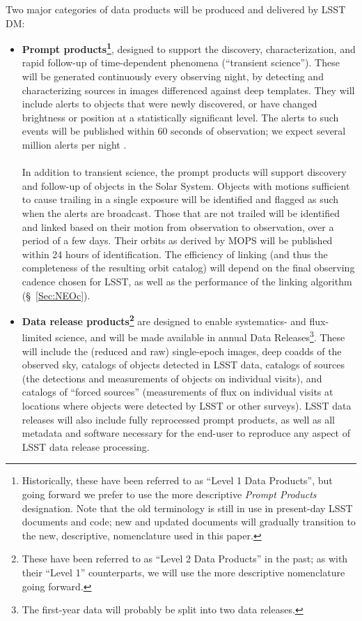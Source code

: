 Two major categories of data products will be produced and delivered by LSST DM:
\begin{itemize}
\item \textbf{  Prompt products\footnote{Historically, these have been referred to as ``Level
1 Data Products'', but going forward we prefer to use the more descriptive
\emph{Prompt Products} designation. Note that the old terminology is still
in use in present-day LSST documents and code; new and updated
documents will gradually transition to the new, descriptive, nomenclature
used in this paper.
}}, designed to support the discovery,
  characterization, and rapid follow-up of time-dependent phenomena
  (``transient science''). These will be generated continuously every
  observing night, by detecting and characterizing sources in images
  differenced against deep templates. They will include alerts to
  objects that were newly discovered, or have changed brightness or
  position at a statistically significant level. The alerts to such
  events will be published within 60 seconds of observation; we
  expect several million alerts per night \citep{RMMOH2014}.\\
\\
In addition to transient science, the prompt products will support
discovery and follow-up of objects in the Solar System. Objects with
motions sufficient to cause trailing in a single exposure will be
identified and flagged as such when the alerts are broadcast. Those
that are not trailed will be identified and linked based on their
motion from observation to observation, over a period of a few
days. Their orbits as derived by MOPS will be published within 24 hours of
identification. The efficiency of linking (and thus the completeness
of the resulting orbit catalog) will depend on the final observing
cadence chosen for LSST, as well as the performance of the linking
algorithm (\S~\ref{Sec:NEOc}).
\item \textbf{Data release products\footnote{These have been referred to as ``Level
2 Data Products'' in the past; as with their ``Level 1'' counterparts, we
will use the more descriptive nomenclature going forward.}} are
  designed to enable systematics- and flux-limited science, and will
  be made available in annual Data Releases\footnote{The first-year
    data will probably be split into two data releases.}. These will include the (reduced and raw) single-epoch images, deep coadds of the observed sky, catalogs of objects detected in LSST data, catalogs of sources (the detections and measurements of objects on individual visits), and catalogs of ``forced sources'' (measurements of flux on individual visits at locations where objects were detected by LSST or other surveys). LSST data releases will also include fully reprocessed prompt products, as well as all metadata and software necessary for the end-user to reproduce any aspect of LSST data release processing.\\

\end{itemize}
